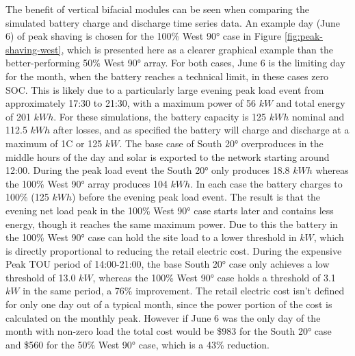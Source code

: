 \documentclass[conference]{IEEEtran}
\begin{document}
The benefit of vertical bifacial modules can be seen when comparing the simulated battery charge and discharge time series data. An example day (June 6) of peak shaving is chosen for the 100\% West 90° case in Figure \ref{fig:peak-shaving-west}, which is presented here as a clearer graphical example than the better-performing 50\% West 90° array. For both cases, June 6 is the limiting day for the month, when the battery reaches a technical limit, in these cases zero SOC. This is likely due to a particularly large evening peak load event from approximately 17:30 to 21:30, with a maximum power of 56 $kW$ and total energy of 201 $kWh$. For these simulations, the battery capacity is 125 $kWh$ nominal and 112.5 $kWh$ after losses, and as specified the battery will charge and discharge at a maximum of 1C or 125 $kW$. The base case of South 20° overproduces in the middle hours of the day and solar is exported to the network starting around 12:00. During the peak load event the South 20° only produces 18.8 $kWh$ whereas the 100\% West 90° array produces 104 $kWh$. In each case the battery charges to 100\% (125 $kWh$) before the evening peak load event. The result is that the evening net load peak in the 100\% West 90° case starts later and contains less energy, though it reaches the same maximum power. Due to this the battery in the 100\% West 90° case can hold the site load to a lower threshold in \(kW\), which is directly proportional to reducing the retail electric cost. During the expensive Peak TOU period of 14:00-21:00, the base South 20° case only achieves a low threshold of 13.0 $kW$, whereas the 100\% West 90° case holds a threshold of 3.1 $kW$ in the same period, a 76\% improvement. The retail electric cost isn't defined for only one day out of a typical month, since the power portion of the cost is calculated on the monthly peak. However if June 6 was the only day of the month with non-zero load the total cost would be \$983 for the South 20° case and \$560 for the 50\% West 90° case, which is a 43\% reduction.
\end{document}

